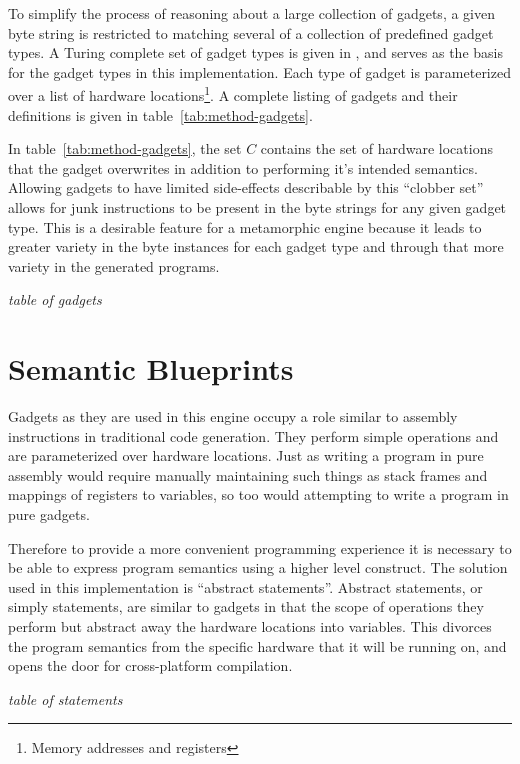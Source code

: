     To simplify the process of reasoning about a large collection of gadgets, a
    given byte string is restricted to matching several of a collection of
    predefined gadget types. A Turing complete set of gadget types is given in
    \cite{franken}, and serves as the basis for the gadget types in this
    implementation. Each type of gadget is parameterized over a list of hardware
    locations\footnote{Memory addresses and registers}. A complete listing of
    gadgets and their definitions is given in table~\ref{tab:method-gadgets}.

    In table~\ref{tab:method-gadgets}, the set $C$ contains the set of hardware
    locations that the gadget overwrites in addition to performing it's intended
    semantics. Allowing gadgets to have limited side-effects describable by this
    ``clobber set'' allows for junk instructions to be present in the byte
    strings for any given gadget type. This is a desirable feature for a
    metamorphic engine because it leads to greater variety in the byte instances
    for each gadget type and through that more variety in the generated
    programs.  

    \emph{table of gadgets}

    \section{Semantic Blueprints}

    Gadgets as they are used in this engine occupy a role similar to assembly
    instructions in traditional code generation. They perform simple operations
    and are parameterized over hardware locations. Just as writing a program in
    pure assembly would require manually maintaining such things as stack frames
    and mappings of registers to variables, so too would attempting to write a
    program in pure gadgets. 

    Therefore to provide a more convenient programming experience it is
    necessary to be able to express program semantics using a higher level
    construct. The solution used in this implementation is ``abstract
    statements''. Abstract statements, or simply statements, are similar to
    gadgets in that the scope of operations they perform but abstract away the
    hardware locations into variables. This divorces the program semantics from
    the specific hardware that it will be running on, and opens the door for
    cross-platform compilation.

    \emph{table of statements}

